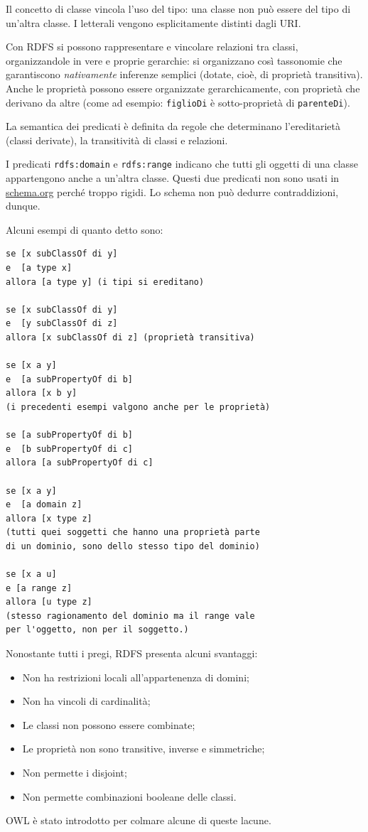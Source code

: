 \documentclass[11pt]{article}
\begin{document}
Il concetto di classe vincola l'uso del tipo: una classe non può essere del tipo di un'altra classe. I letterali vengono esplicitamente distinti dagli URI.

Con RDFS si possono rappresentare e vincolare relazioni tra classi, organizzandole in vere e proprie gerarchie: si organizzano così tassonomie che garantiscono \textit{nativamente} inferenze semplici (dotate, cioè, di proprietà transitiva).
Anche le proprietà possono essere organizzate gerarchicamente, con proprietà che derivano da altre (come ad esempio: \verb|figlioDi| è sotto-proprietà di \verb|parenteDi|).

La semantica dei predicati è definita da regole che determinano l'ereditarietà (classi derivate), la transitività di classi e relazioni.

I predicati \verb|rdfs:domain| e \verb|rdfs:range| indicano che tutti gli oggetti di una classe appartengono anche a un'altra classe.
Questi due predicati non sono usati in \url{schema.org} perché troppo rigidi. Lo schema non può dedurre contraddizioni, dunque.

Alcuni esempi di quanto detto sono:
\begin{verbatim}
se [x subClassOf di y] 		
e  [a type x]				 
allora [a type y] (i tipi si ereditano)

se [x subClassOf di y]
e  [y subClassOf di z]
allora [x subClassOf di z] (proprietà transitiva)

se [x a y]
e  [a subPropertyOf di b]
allora [x b y] 
(i precedenti esempi valgono anche per le proprietà)

se [a subPropertyOf di b]
e  [b subPropertyOf di c]
allora [a subPropertyOf di c]

se [x a y]
e  [a domain z]
allora [x type z]
(tutti quei soggetti che hanno una proprietà parte 
di un dominio, sono dello stesso tipo del dominio) 
                   
se [x a u]
e [a range z]
allora [u type z] 
(stesso ragionamento del dominio ma il range vale 
per l'oggetto, non per il soggetto.)                
\end{verbatim}

Nonostante tutti i pregi, RDFS presenta alcuni svantaggi:
\begin{itemize}
\item Non ha restrizioni locali all'appartenenza di domini;
\item Non ha vincoli di cardinalità;
\item Le classi non possono essere combinate;
\item Le proprietà non sono transitive, inverse e simmetriche;
\item Non permette i disjoint;
\item Non permette combinazioni booleane delle classi.
\end{itemize}
OWL è stato introdotto per colmare alcune di queste lacune.
\end{document}
